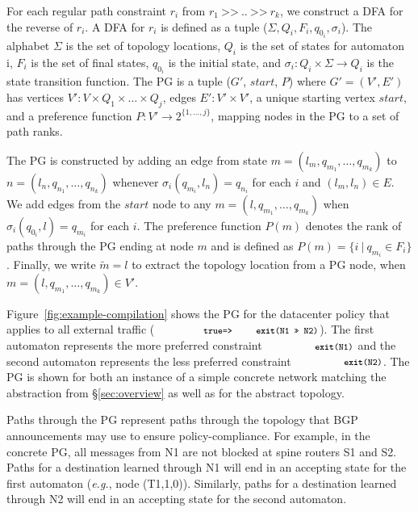 \documentclass[numbers, 10pt, preprint]{sigplanconf}
\newcommand{\EG}{\emph{e.g.}}
\newcommand{\set}[1]{\ensuremath{\{ #1 \} }}
\newcommand{\CD}[1]{\texttt{\small #1}}  %
\newcommand{\KW}[1]{\texttt{\small\bfseries{#1}}}
\newcommand{\True}{\CD{true}}
\newcommand{\Prefer}{\texttt{>>}}
\newcommand{\Path}{\texttt{=>}}
\newcommand{\Exit}{\KW{exit}}
\begin{document}
For each regular path constraint $r_i$ from $r_1 ~\Prefer~ .. ~\Prefer~ r_k$, we construct a DFA for the reverse of $r_i$. A DFA for $r_i$ is defined as a tuple ($\Sigma, Q_i, F_i, q_{0_i}, \sigma_i$). The alphabet $\Sigma$ is the set of topology locations, $Q_i$ is the set of states for automaton i, $F_i$ is the set of final states, $q_{0_i}$ is the initial state, and $\sigma_i \colon Q_i \times \Sigma \rightarrow Q_i$ is the state transition function.
%
The PG is a tuple ($G'$, $start$, $P$) where $G' = (V',E')$ has
vertices $V' \colon V \times Q_1 \times \dots \times Q_j$,
edges $E' \colon V' \times V'$,
a unique starting vertex $start$,
and a preference function $P \colon V' \rightarrow 2^{\set{1, \dots, j}}$, mapping nodes in the PG to a set of path ranks.

The PG is constructed by adding an edge from state $m = (l_m, q_{m_1}, \dots, q_{m_k})$ to $n = (l_n, q_{n_1}, \dots, q_{n_k})$ whenever $\sigma_i(q_{m_i}, l_n) = q_{n_i}$ for each $i$ and $(l_m,l_n) \in E$.
%
We add edges from the $\mathit{start}$ node to any $m = (l, q_{m_1}, \dots, q_{m_k})$ when $\sigma_i(q_{0_i}, l) = q_{m_i}$ for each $i$.
%
The preference function $P(m)$ denotes the rank of paths through the PG ending at node $m$ and is defined as $P(m) = \set{i~\vert~q_{m_i} \in F_i}$.
%
Finally, we write $\tilde{m} = l$ to extract the topology location from a PG node, when $m = (l, q_{m_1}, \dots, q_{m_k}) \in V'$.

Figure~\ref{fig:example-compilation} shows the PG for the datacenter policy that applies to all external traffic ($\CD{\True \Path \Exit(N1~\Prefer~N2)}$).
%
%
The first automaton represents the more preferred constraint $\CD{\Exit(N1)}$ and the second automaton represents the less preferred constraint $\CD{\Exit(N2)}$. The PG is shown for both an instance of a simple concrete network matching the abstraction from \S\ref{sec:overview} as well as for the abstract topology.

Paths through the PG represent paths through the topology that BGP announcements may use to ensure policy-compliance. For example, in the concrete PG, all messages from N1 are not blocked at spine routers S1 and S2. Paths for a destination learned through N1 will end in an accepting state for the first automaton (\EG, node (T1,1,0)). Similarly, paths for a destination learned through N2 will end in an accepting state for the second automaton.
\end{document}
